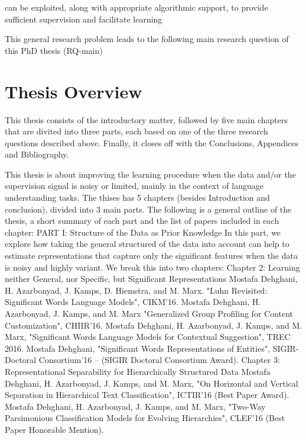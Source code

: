 can be exploited, along with appropriate algorithmic support, to provide sufficient supervision and facilitate learning

This general research problem leads to
the following main research question of this PhD thesis (RQ-main) 

\section{Thesis Overview}
This thesis consists of the introductory matter, followed by five main
chapters that are divited into three parts, each based on one of the three research questions described above.
Finally, it closes off with the Conclusions, Appendices and Bibliography. 


This thesis is about improving the learning procedure when the data and/or the supervision signal is noisy or limited, mainly in the context of language understanding tasks. The thises has 5 chapters (besides Introduction and conclusion), divided into 3 main parts. The following is a general outline of the thesis, a short summary of each part and the list of papers included in each chapter: 
PART I: Structure of the Data as Prior Knowledge
In this part, we explore how taking the general structured of the data into account can help to estimate representations that capture only the significant features when the data is noisy and highly variant. We break this into two chapters:
Chapter 2: Learning neither General, nor Specific, but Significant Representations 
Mostafa Dehghani, H. Azarbonyad, J. Kamps, D. Hiemstra, and M. Marx. "Luhn Revisited: Significant Words Language Models", CIKM'16.
Mostafa Dehghani, H. Azarbonyad, J. Kamps, and M. Marx "Generalized Group Profiling for Content Customization", CHIIR'16.
Mostafa Dehghani, H. Azarbonyad, J. Kamps, and M. Marx, "Significant Words Language Models for Contextual Suggestion", TREC  2016.
Mostafa Dehghani, "Significant Words Representations of Entities", SIGIR-Doctoral Consortium'16 -- (SIGIR Doctoral Consortium Award).
Chapter 3:  Representational Separability for Hierarchically Structured Data
Mostafa Dehghani, H. Azarbonyad, J. Kamps, and M. Marx, "On Horizontal and Vertical Separation in Hierarchical Text Classification", ICTIR'16 (Best Paper Award).
Mostafa Dehghani, H. Azarbonyad, J. Kamps, and M. Marx, "Two-Way Parsimonious Classification Models for Evolving Hierarchies", CLEF'16 (Best Paper Honorable Mention).

